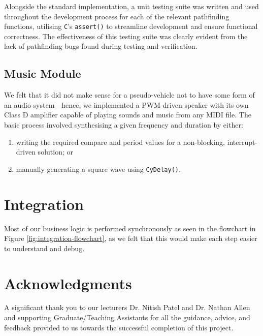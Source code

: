\documentclass[conference]{IEEEtran}
\begin{document}
Alongside the standard implementation, a unit testing suite was written and used throughout the development process for each of the relevant pathfinding functions, utilising \texttt{C}'s \texttt{assert()} to streamline development and ensure functional correctness.
The effectiveness of this testing suite was clearly evident from the lack of pathfinding bugs found during testing and verification.

\subsection{Music Module}

We felt that it did not make sense for a pseudo-vehicle not to have some form of an audio system—hence, we implemented a PWM-driven speaker with its own Class D amplifier capable of playing sounds and music from any MIDI file.
The basic process involved synthesising a given frequency and duration by either:
\begin{enumerate}
	\item writing the required compare and period values for a non-blocking, interrupt-driven solution; or
	\item manually generating a square wave using \texttt{CyDelay()}.
\end{enumerate}

\section{Integration}

Most of our business logic is performed synchronously as seen in the flowchart in Figure \ref{fig:integration-flowchart}, as we felt that this would make each step easier to understand and debug.


\section*{Acknowledgments}

A significant thank you to our lecturers Dr. Nitish Patel and Dr. Nathan Allen and supporting Graduate/Teaching Assistants for all the guidance, advice, and feedback provided to us towards the successful completion of this project.


\nocite{*}



\appendix
\end{document}
